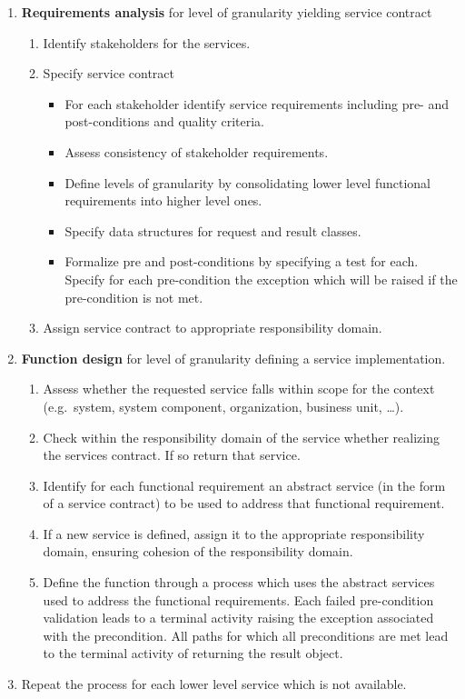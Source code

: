 \begin{enumerate}
 \item {\bf Requirements analysis} for level of granularity yielding service contract
  \begin{enumerate}
    \item Identify stakeholders for the services.
    \item Specify service contract 
      \begin{itemize}
       \item For each stakeholder identify service requirements including pre- and post-conditions and quality criteria.
       \item Assess consistency of stakeholder requirements.
       \item Define levels of granularity by consolidating lower level functional requirements into higher level ones. 
       \item Specify data structures for request and result classes.
       \item Formalize pre and post-conditions by specifying a test for each. Specify for each pre-condition the exception which will be raised if the pre-condition is not met.
     \end{itemize}
    \item Assign service contract to appropriate responsibility domain.
  \end{enumerate}

 \item {\bf Function design} for level of granularity defining a service implementation.
      \begin{enumerate}
	\item Assess whether the requested service falls within scope for the context (e.g.\ system, system component, organization, business unit, \dots).
	\item Check within the responsibility domain of the service whether realizing the services contract. If so return that service.
        \item Identify for each functional requirement an abstract service (in the form of a service contract) to be used to address that functional requirement.
	\item If a new service is defined, assign it to the appropriate responsibility domain, ensuring cohesion of the responsibility domain. 
	\item Define the function through a process which uses the abstract services used to address the functional requirements. Each failed pre-condition validation leads to a terminal activity raising the exception associated with the precondition. All paths for which all preconditions are met lead to the terminal activity of returning the result object.
      \end{enumerate}

  \item Repeat the process for each lower level service which is not available.
\end{enumerate}

